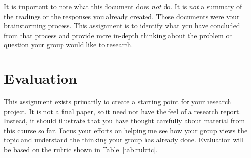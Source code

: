 \documentclass[12pt,oneside]{amsart}	%
\begin{document}
 It is important to note what this document does \emph{not} do. It is \emph{not} a summary of the readings or the responses you already created. Those documents were your brainstorming process. This assignment is to identify what you have concluded from that process and provide more in-depth thinking about the problem or question your group would like to research.

\section{Evaluation} %
\label{sec:evaluation}
This assignment exists primarily to create a starting point for your research project. It is not a final paper, so it need not have the feel of a research report. Instead, it should illustrate that you have thought carefully about material from this course so far. Focus your efforts on helping me see how your group views the topic and understand the thinking your group has already done. Evaluation will be based on the rubric shown in Table~\ref{tab:rubric}.

\begin{comment}%
	\section{Procedure} %
	\label{sec:procedure}
	Before you start auditing your brainstorming process, get your thoughts in order. Your reading responses, history as a writer, and research experience (if any) should be in mind as you draft this assignment.
	\begin{enumerate}
		\item Identify a problem, issue, or concern you have related to writing, reading, language, or literacy. Choose something you would genuinely like to learn more about.
		\item Question yourself to determine why this topic interests you or why you want to know more about it. You might want to discuss it with a friend or do some freewriting to get your thoughts moving.
		\item Come up with a finish line. What could you learn that would satisfy your curiosity? What is your goal in this project?
		\item Now write. Put the ideas from the items above in a two-page document that puts your ideas in writing, helps me understand your thinking/goals, and shows your classmates where you're heading with your project.
	\end{enumerate}
\end{comment}
\end{document}

